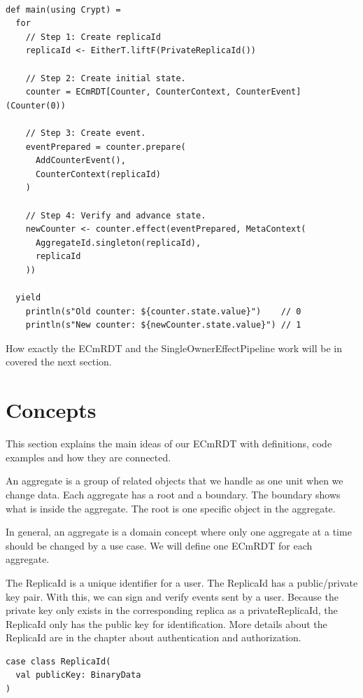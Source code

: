 \documentclass[
	ngerman,
	ruledheaders=section,   %
	class=report,		    %
	thesis={type=bachelor}, %
	accentcolor=9c,			%
	custommargins=true,    %
	marginpar=false,        %
	parskip=half-,          %
	fontsize=11pt,          %
]{tudapub}
\begin{document}
\begin{lstlisting}
    
def main(using Crypt) = 
  for
    // Step 1: Create replicaId
    replicaId <- EitherT.liftF(PrivateReplicaId())

    // Step 2: Create initial state.
    counter = ECmRDT[Counter, CounterContext, CounterEvent](Counter(0))

    // Step 3: Create event.
    eventPrepared = counter.prepare(
      AddCounterEvent(),
      CounterContext(replicaId)
    )

    // Step 4: Verify and advance state.
    newCounter <- counter.effect(eventPrepared, MetaContext(
      AggregateId.singleton(replicaId), 
      replicaId
    ))

  yield
    println(s"Old counter: ${counter.state.value}")    // 0
    println(s"New counter: ${newCounter.state.value}") // 1

\end{lstlisting}

How exactly the ECmRDT and the SingleOwnerEffectPipeline work will be in covered the next section.

\section{Concepts}

This section explains the main ideas of our ECmRDT with definitions, code examples and how they are connected.


An aggregate is a group of related objects that we handle as one unit when we change data. Each aggregate has a root and a boundary. The boundary shows what is inside the aggregate. The root is one specific object in the aggregate. 

In general, an aggregate is a domain concept where only one aggregate at a time should be changed by a use case. We will define one ECmRDT for each aggregate.

The ReplicaId is a unique identifier for a user. The ReplicaId has a public/private key pair. With this, we can sign and verify events sent by a user. Because the private key only exists in the corresponding replica as a privateReplicaId, the ReplicaId only has the public key for identification. More details about the ReplicaId are in the chapter about authentication and authorization.

\begin{lstlisting}
case class ReplicaId(
  val publicKey: BinaryData
)
\end{lstlisting}
\end{document}

